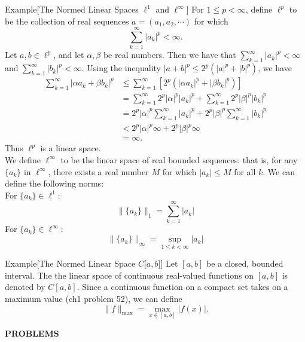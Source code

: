 \begin{flushleft}
	\begin{namedthm*}{Example}[The Normed Linear Spaces $\ell^1$ and $\ell^\infty$]
		For $1\le p<\infty$, define $\ell^p$ to be the collection of real sequences $a=(a_1,a_2,\cdots)$ for which 
		\[
		\sum_{k=1}^\infty|a_k|^p<\infty .	
		\]
		Let $a,b \in \ell^p$, and let $\alpha , \beta$ be real numbers.
		Then we have that $\sum_{k=1}^\infty|a_k|^p<\infty$ and $\sum_{k=1}^\infty|b_k|^p<\infty$.
		Using the inequality $|a+b|^p\le2^p(|a|^p+|b|^p)$, we have
		\begin{align*}
			\sum_{k=1}^\infty|\alpha a_k + \beta b_k|^p &\le \sum_{k=1}^\infty[2^p(|\alpha a_k|^p + |\beta b_k|^p)]\\ 
			&=\sum_{k=1}^\infty2^p|\alpha|^p |a_k|^p+\sum_{k=1}^\infty2^p|\beta|^p| b_k|^p\\
			&=2^p|\alpha|^p\sum_{k=1}^\infty |a_k|^p+2^p|\beta|^p\sum_{k=1}^\infty| b_k|^p\\
			&< 2^p|\alpha|^p\infty+2^p|\beta|^p\infty\\
			&=\infty.
		\end{align*}
		Thus $\ell^p$ is a linear space.\\
		We define $\ell^\infty$ to be the linear space of real bounded sequences: that is, for any $\{a_k\}$ in $\ell^\infty$, there exists a real number $M$ for which $|a_k|\le M$ for all $k$.
		We can define the following norms:
		\\For $\{a_k\}\in\ell^1$:
		\[
			\|\{a_k\}\|_1 = \sum_{k=1}^\infty|a_k|
		\]
		For $\{a_k\}\in\ell^\infty$:
		\[
			\|\{a_k\}\|_\infty = \sup_{1\le k<\infty}|a_k|
		\]
	\end{namedthm*}

	\begin{namedthm*}{Example}[The Normed Linear Space $C\lbrack a,b\rbrack$]
		Let $[a,b]$ be a closed, bounded interval. 
		The the linear space of continuous real-valued functions on $[a,b]$ is denoted by $C[a,b]$. 
		Since a continuous function on a compact set takes on a maximum value (ch1 problem 52), we can define
		\[
		\|f\|_{\max}=\max_{x\in [a,b]}|f(x)|.	
		\]		
	\end{namedthm*}

\end{flushleft}
\begin{center}
	\textbf{PROBLEMS}
\end{center}

